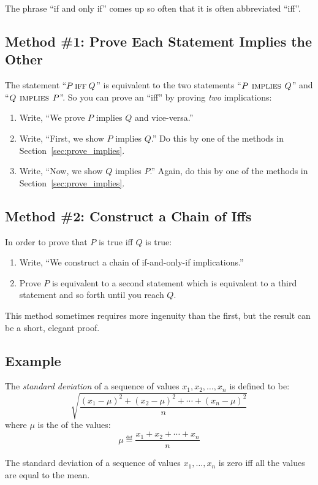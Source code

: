 The phrase ``if and only if'' comes up so often that it is often
abbreviated ``iff''.

\subsection{Method \#1:  Prove Each Statement Implies the Other}

The statement ``$P \mathbin{\mathrm{\textsc{iff}}} Q$'' is equivalent to the two statements ``$P
\mathbin{\mathrm{\textsc{\,implies\,}}} Q$'' and ``$Q \mathbin{\mathrm{\textsc{\,implies\,}}} P$''.  So you can prove an ``iff'' by
proving \textit{two} implications:
%
\begin{enumerate}
\item Write, ``We prove $P$ implies $Q$ and vice-versa.''
\item Write, ``First, we show $P$ implies $Q$.'' Do this by one
of the methods in Section~\ref{sec:prove_implies}.
\item Write, ``Now, we show $Q$ implies $P$.''  Again, do this by
one of the methods in Section~\ref{sec:prove_implies}.
\end{enumerate}

\subsection{Method \#2:  Construct a Chain of Iffs}
In order to prove that $P$ is true iff $Q$ is true:
%
\begin{enumerate}
\item Write, ``We construct a chain of if-and-only-if implications.''
\item Prove $P$ is equivalent to a second statement which is
equivalent to a third statement and so forth until you reach $Q$.
\end{enumerate}
%
This method sometimes requires more ingenuity than the first, but the
result can be a short, elegant proof.

\subsection*{Example}
The \textit{standard deviation} of a sequence of values $x_1, x_2,
\dots, x_n$ is defined to be:
%
\begin{equation}\label{sd}
\sqrt{\frac{(x_1 - \mu)^2 + (x_2 - \mu)^2 + \cdots + (x_n - \mu)^2}{n}}
\end{equation}
%
where $\mu$ is the  of the values:
%
\[
\mu \eqdef \frac{x_1 + x_2 + \cdots + x_n}{n}
\]

\begin{theorem}
The standard deviation of a sequence of values $x_1, \dots, x_n$ is
zero iff all the values are equal to the mean.
\end{theorem}


